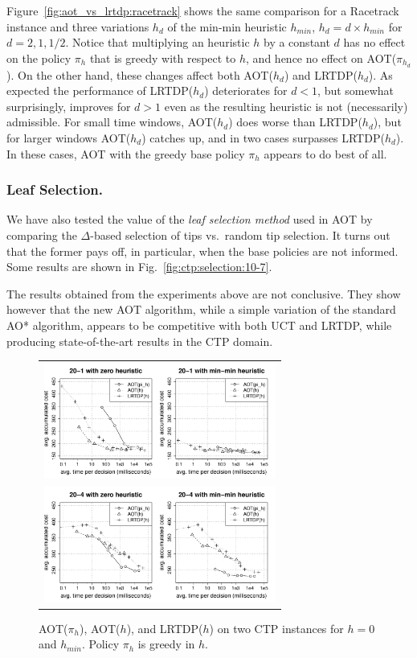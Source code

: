 \documentclass[letterpaper]{article}
\begin{document}
Figure~\ref{fig:aot_vs_lrtdp:racetrack} shows the same  comparison for
a Racetrack instance and three variations $h_d$ of the min-min heuristic
$h_{min}$, $h_d = d \times h_{min}$ for $d=2,1,1/2$. Notice that multiplying
an heuristic $h$ by a constant $d$ has no effect on the policy $\pi_h$
that is greedy with respect to  $h$, and hence no effect on AOT($\pi_{h_d}$).
On the other hand, these changes  affect both AOT($h_d$) and LRTDP($h_d$).
As expected the performance of LRTDP($h_d$) deteriorates  for  $d < 1$,
but somewhat surprisingly,  improves for $d > 1$ even as the resulting heuristic
is not (necessarily) admissible.   For small time windows, AOT($h_d$) does worse than LRTDP($h_d$),
but for larger   windows AOT($h_d$) catches up,  and in two cases surpasses  LRTDP($h_d$).
In these cases, AOT with the greedy  base policy $\pi_h$ appears to do  best of all.


\subsubsection{Leaf Selection.} We have also  tested the  value of  the \emph{leaf selection method} used in
AOT by comparing the $\Delta$-based selection of tips vs.\  random tip selection.
It turns out that the former pays off, in particular, when the base policies
are not informed. Some results are shown in Fig.~\ref{fig:ctp:selection:10-7}.

The results obtained from the experiments above are not conclusive. They show however
that the new AOT algorithm, while a simple variation of the standard AO* algorithm, appears
to be competitive with both UCT and LRTDP, while producing state-of-the-art results
in the  CTP domain.

\begin{figure}
\centering
\begin{tabular}{c}
\includegraphics[width=3in,clip=on,trim=.75cm 0cm 1.5cm 1cm]{ctp_aot_vs_lrtdp_20_1.pdf} \\
\includegraphics[width=3in,clip=on,trim=.75cm .7cm 1.5cm 1cm]{ctp_aot_vs_lrtdp_20_4.pdf}
\end{tabular}
\caption{AOT($\pi_h$), AOT($h$), and LRTDP($h$) on two CTP instances
  for $h=0$ and $h_{min}$. Policy $\pi_h$ is greedy in $h$.}
\label{fig:aot_vs_lrtdp:ctp}
\end{figure}
\end{document}
